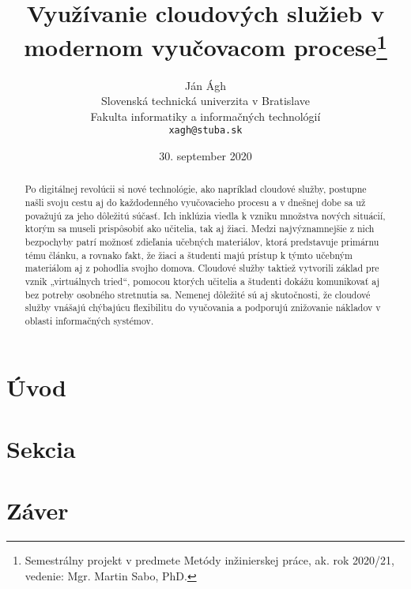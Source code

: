 \documentclass[10pt,twoside,slovak,a4paper]{article}
\title{Využívanie cloudových služieb v modernom vyučovacom procese\thanks{Semestrálny projekt v predmete Metódy inžinierskej práce, ak. rok 2020/21, vedenie: Mgr. Martin Sabo, PhD.}} %
\author{Ján Ágh\\[2pt]
	{\small Slovenská technická univerzita v Bratislave}\\
	{\small Fakulta informatiky a informačných technológií}\\
	{\small \texttt{xagh@stuba.sk}}
	}
\date{\small 30. september 2020} %
\begin{document}
\maketitle

\begin{abstract}

Po digitálnej revolúcii si nové technológie, ako napríklad cloudové služby, postupne
našli svoju cestu aj do každodenného vyučovacieho procesu a v dnešnej dobe sa už považujú
za jeho dôležitú súčasť. Ich inklúzia viedla k vzniku množstva nových situácií, ktorým sa
museli prispôsobiť ako učitelia, tak aj žiaci. Medzi najvýznamnejšie z nich bezpochyby patrí
možnosť zdieľania učebných materiálov, ktorá predstavuje primárnu tému článku, a rovnako
fakt, že žiaci a študenti majú prístup k týmto učebným materiálom aj z pohodlia svojho
domova. Cloudové služby taktiež vytvorili základ pre vznik „virtuálnych tried“, pomocou
ktorých učitelia a študenti dokážu komunikovať aj bez potreby osobného stretnutia sa.
Nemenej dôležité sú aj skutočnosti, že cloudové služby vnášajú chýbajúcu flexibilitu do
vyučovania a podporujú znižovanie nákladov v oblasti informačných systémov.

\end{abstract}



\section{Úvod}



\section{Sekcia}


\section{Záver}



\end{document}
